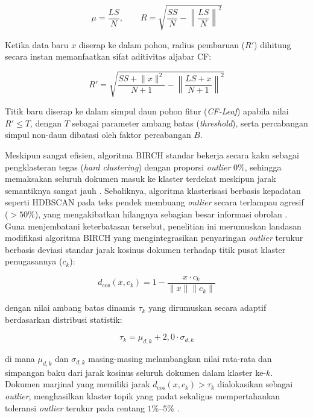 \begin{equation}
	\mu = \frac{LS}{N}, \qquad R = \sqrt{\frac{SS}{N} - \left\lVert \frac{LS}{N} \right\rVert^2}
\end{equation}

Ketika data baru $x$ diserap ke dalam pohon, radius pembaruan ($R'$) dihitung secara instan memanfaatkan sifat aditivitas aljabar CF:

\begin{equation}
	R' = \sqrt{\frac{SS + \lVert x \rVert^2}{N+1} - \left\lVert \frac{LS + x}{N+1} \right\rVert^2}
\end{equation}

Titik baru diserap ke dalam simpul daun pohon fitur (\textit{CF-Leaf}) apabila nilai $R' \le T$, dengan $T$ sebagai parameter ambang batas (\textit{threshold}), serta percabangan simpul non-daun dibatasi oleh faktor percabangan $B$.

Meskipun sangat efisien, algoritma BIRCH standar bekerja secara kaku sebagai pengklasteran tegas (\textit{hard clustering}) dengan proporsi \textit{outlier} 0\%, sehingga memaksakan seluruh dokumen masuk ke klaster terdekat meskipun jarak semantiknya sangat jauh \citep{Ramadhani_2020}. Sebaliknya, algoritma klasterisasi berbasis kepadatan seperti HDBSCAN pada teks pendek membuang \textit{outlier} secara terlampau agresif ($>50\%$), yang mengakibatkan hilangnya sebagian besar informasi obrolan \citep{iaes2025indobert}. Guna menjembatani keterbatasan tersebut, penelitian ini merumuskan landasan modifikasi algoritma BIRCH yang mengintegrasikan penyaringan \textit{outlier} terukur berbasis deviasi standar jarak kosinus dokumen terhadap titik pusat klaster penugasannya ($c_k$):

\begin{equation}
	d_{\cos}(x, c_k) = 1 - \frac{x \cdot c_k}{\lVert x \rVert \lVert c_k \rVert}
\end{equation}

\noindent dengan nilai ambang batas dinamis $\tau_k$ yang dirumuskan secara adaptif berdasarkan distribusi statistik:

\begin{equation}
	\tau_k = \mu_{d, k} + 2{,}0 \cdot \sigma_{d, k}
\end{equation}

\noindent di mana $\mu_{d,k}$ dan $\sigma_{d,k}$ masing-masing melambangkan nilai rata-rata dan simpangan baku dari jarak kosinus seluruh dokumen dalam klaster ke-$k$. Dokumen marjinal yang memiliki jarak $d_{\cos}(x, c_k) > \tau_k$ dialokasikan sebagai \textit{outlier}, menghasilkan klaster topik yang padat sekaligus mempertahankan toleransi \textit{outlier} terukur pada rentang $1\%$--$5\%$ \citep{iaes2025indobert}.

